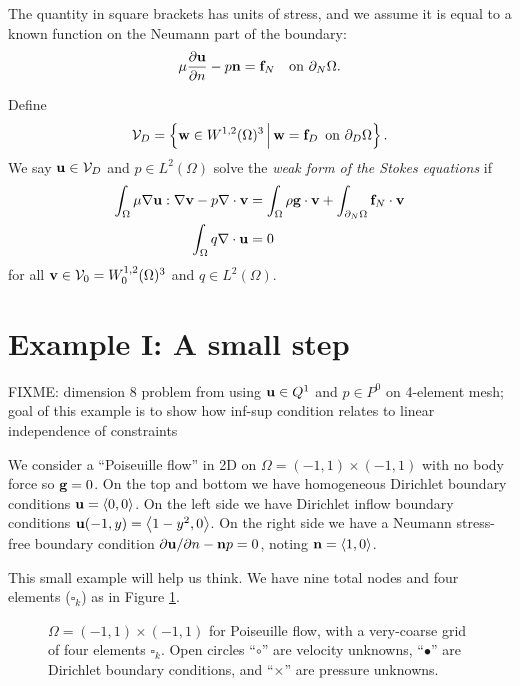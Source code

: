 The quantity in square brackets has units of stress, and we assume it is equal to a known function on the Neumann part of the boundary:
\begin{equation}
\mu \frac{\partial \mathbf{u}}{\partial n} - p \mathbf{n} = \mathbf{f}_N \quad \text{on } \partial_N \Omega.  \label{eq:ok:neumannbc}
\end{equation}

Define
\begin{equation}
\mathcal{V}_D = \left\{\mathbf{w} \in W^{1,2}(\Omega)^3 \,\Big|\, \mathbf{w} = \mathbf{f}_D \, \text{ on } \partial_D \Omega\right\}. \label{eq:ok:dirichletbc}
\end{equation}
We say $\mathbf{u} \in \mathcal{V}_D$ and $p \in L^2(\Omega)$ solve the \emph{weak form of the Stokes equations} if
\begin{align}
\int_\Omega \mu \nabla \mathbf{u} : \nabla \mathbf{v} - p \nabla\cdot \mathbf{v} &= \int_\Omega \rho \mathbf{g} \cdot \mathbf{v} + \int_{\partial_N \Omega} \mathbf{f}_N \cdot \mathbf{v} \label{eq:ok:weakstokesvelocity} \\
\int_\Omega q \nabla\cdot \mathbf{u} &= 0 \label{eq:ok:weakstokespressure}
\end{align}
for all $\mathbf{v} \in \mathcal{V}_0 = W_0^{1,2}(\Omega)^3$ and $q \in L^2(\Omega)$.


\section{Example I: A small step}

FIXME: dimension 8 problem from using $\mathbf{u}\in Q^1$ and $p\in P^0$ on 4-element mesh; goal of this example is to show how inf-sup condition relates to linear independence of constraints

We consider a ``Poiseuille flow'' \citep{Elmanetal2005} in 2D on $\Omega=(-1,1)\times(-1,1)$ with no body force so $\mathbf{g}=0$.  On the top and bottom we have homogeneous Dirichlet boundary conditions $\mathbf{u}=\left<0,0\right>$.  On the left side we have Dirichlet inflow boundary conditions $\mathbf{u}(-1,y) = \left<1-y^2,0\right>$.  On the right side we have a Neumann stress-free boundary condition $\partial \mathbf{u}/\partial n - \mathbf{n} p = 0$, noting $\mathbf{n} = \left<1,0\right>$.

\newcommand{\one}{{\large \mathbb{1}}}

This small example will help us think.  We have nine total nodes and four elements ($\square_k$) as in Figure \ref{fig:ok:poiseuille}.

\begin{figure}

\caption{$\Omega=(-1,1)\times(-1,1)$ for Poiseuille flow, with a very-coarse grid of four elements $\square_k$.  Open circles ``{\large $\circ$}'' are velocity unknowns, ``$\bullet$'' are Dirichlet boundary conditions, and ``$\times$'' are pressure unknowns.}
\label{fig:ok:poiseuille}
\end{figure}

